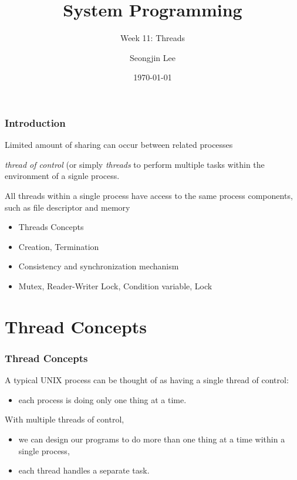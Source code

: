 \documentclass[newPxFont,sthlmFooter,nooffset]{beamer}
\title{System Programming}
\subtitle{Week 11: Threads}
\author[SJL]{Seongjin Lee}
\institute{\href{mailto:insight@gnu.ac.kr}{insight@gnu.ac.kr}\\\url{http://open.gnu.ac.kr}\\Systems Research Lab.\\Gyeongsang National University}
\date{\today}
\begin{document}
\frame[plain]{\titlepage}






\begin{frame}[t]
  \frametitle{Introduction}

Limited amount of sharing can occur between related processes

\textit{thread of control} (or simply \textit{threads} to perform multiple tasks within the environment of a signle process.

All threads within a single process have access to the same process components, such as file descriptor and memory


  \begin{itemize}
  \item Threads Concepts
  \item Creation, Termination
  \item Consistency and synchronization mechanism
  \item Mutex, Reader-Writer Lock, Condition variable, Lock
  \end{itemize}

\end{frame}

\section{Thread Concepts}



\begin{frame}[t]
  \frametitle{Thread Concepts}
A typical UNIX process can be thought of as having a single thread of control:
\begin{itemize}
\item each process is doing only one thing at a time.
\end{itemize}

With multiple threads of control,
\begin{itemize}
\item we can design our programs to do more than one thing at a time
  within a single process,
\item each thread handles a separate task.
\end{itemize}


\end{frame}
\end{document}
